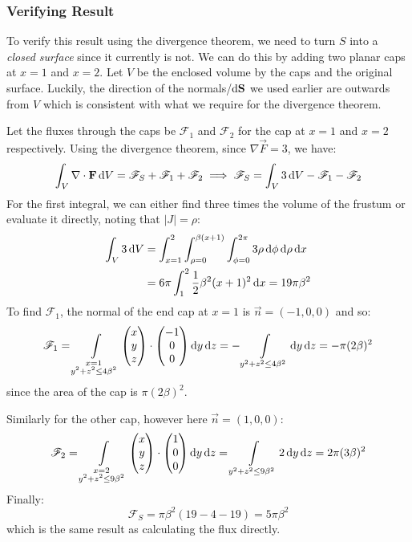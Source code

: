 \documentclass[../main.tex]{subfiles}
\begin{document}
\subsubsection{Verifying Result}
To verify this result using the divergence theorem, we need to turn $S$ into a \textit{closed surface} since it currently is not.
We can do this by adding two planar caps at $x = 1$ and $x = 2$.
Let $V$ be the enclosed volume by the caps and the original surface.
Luckily, the direction of the normals/$\d{\vec{S}}$ we used earlier are outwards from $V$ which is consistent with what we require for the divergence theorem.

Let the fluxes through the caps be $\mathscr{F}_1$ and $\mathscr{F}_2$ for the cap at $x = 1$ and $x = 2$ respectively.
Using the divergence theorem, since $\nabla \vec{F} = 3$, we have:
\[
  \int_{V} \nabla \cdot \vec{F} \d{V} = \mathscr{F}_{S} + \mathscr{F}_1 + \mathscr{F}_2 \implies \mathscr{F}_S = \int_{V} 3 \d{V} - \mathscr{F}_1 - \mathscr{F}_2
\]
For the first integral, we can either find three times the volume of the frustum or evaluate it directly, noting that $|J| = \rho$:
\begin{align*}
  \int_{V} 3 \d{V} &= \int_{x = 1}^{2} \int_{\rho = 0}^{\beta(x + 1)} \int_{\phi = 0}^{2\pi} 3\rho \d{\phi} \d{\rho} \d{x} \\
                   &= 6\pi \int_{1}^{2} \frac{1}{2}\beta^2(x + 1)^2 \d{x} = 19\pi \beta^2
\end{align*}
To find $\mathscr{F}_1$, the normal of the end cap at $x = 1$ is $\vec{n} = (-1, 0, 0)$ and so:
\[
  \mathscr{F}_1 = \int\limits_{\substack{x = 1 \\ y^2 + z^2 \leq 4\beta^2}} \begin{pmatrix}
  x \\
  y \\
  z \\
  \end{pmatrix} \cdot \begin{pmatrix}
  -1 \\
  0 \\
  0 \\
  \end{pmatrix} \d{y} \d{z} = -\int\limits_{y^2 + z^2 \leq 4\beta^2}  \d{y} \d{z} = -\pi(2\beta)^2
\]
since the area of the cap is $\pi(2\beta)^2$.

Similarly for the other cap, however here $\vec{n} = (1, 0, 0)$:
\[
  \mathscr{F}_2 = \int\limits_{\substack{x = 2 \\ y^2 + z^2 \leq 9\beta^2}} \begin{pmatrix}
  x \\
  y \\
  z \\
  \end{pmatrix} \cdot \begin{pmatrix}
  1 \\
  0 \\
  0 \\
  \end{pmatrix} \d{y} \d{z} = \int\limits_{y^2 + z^2 \leq 9\beta^2} 2 \d{y} \d{z} = 2\pi(3\beta)^2
\]
Finally:
\[
  \mathscr{F}_S = \pi \beta^2(19 - 4 - 19) = 5\pi \beta^2
\]
which is the same result as calculating the flux directly.
\end{document}

